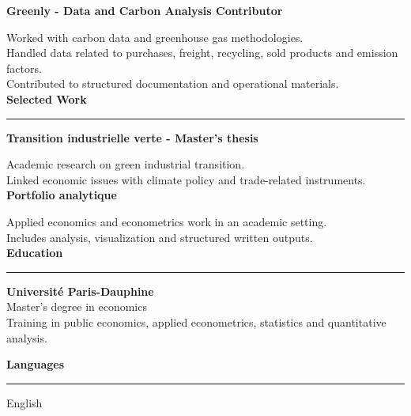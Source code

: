 \documentclass[11pt,a4paper]{article}
\newcommand{\sectiontitle}[1]{\vspace{0.26cm}\textbf{\large #1}\vspace{0.10cm}\hrule\vspace{0.13cm}}
\begin{document}
\vspace{0.25cm}
\textbf{Greenly - Data and Carbon Analysis Contributor} \hfill  \hfill 

Worked with carbon data and greenhouse gas methodologies.\\
Handled data related to purchases, freight, recycling, sold products and emission factors.\\
Contributed to structured documentation and operational materials.\\


\sectiontitle{Selected Work}

\textbf{Transition industrielle verte - Master's thesis} \hfill 

Academic research on green industrial transition.\\
Linked economic issues with climate policy and trade-related instruments.\\


\vspace{0.22cm}
\textbf{Portfolio analytique} \hfill 

Applied economics and econometrics work in an academic setting.\\
Includes analysis, visualization and structured written outputs.\\



\sectiontitle{Education}

\textbf{Université Paris-Dauphine} \hfill \\
Master's degree in economics\\
Training in public economics, applied econometrics, statistics and quantitative analysis.


\sectiontitle{Languages}

English
\end{document}
